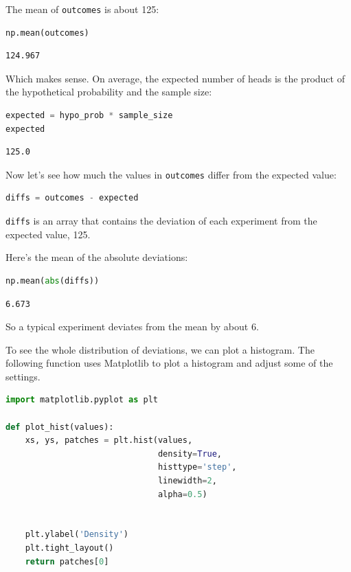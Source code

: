 The mean of \passthrough{\lstinline!outcomes!} is about 125:

\begin{lstlisting}[language=Python,style=source]
np.mean(outcomes)
\end{lstlisting}

\begin{lstlisting}[style=output]
124.967
\end{lstlisting}

Which makes sense. On average, the expected number of heads is the
product of the hypothetical probability and the sample size:

\begin{lstlisting}[language=Python,style=source]
expected = hypo_prob * sample_size
expected
\end{lstlisting}

\begin{lstlisting}[style=output]
125.0
\end{lstlisting}

Now let's see how much the values in \passthrough{\lstinline!outcomes!}
differ from the expected value:

\begin{lstlisting}[language=Python,style=source]
diffs = outcomes - expected
\end{lstlisting}

\passthrough{\lstinline!diffs!} is an array that contains the deviation
of each experiment from the expected value, 125.

Here's the mean of the absolute deviations:

\begin{lstlisting}[language=Python,style=source]
np.mean(abs(diffs))
\end{lstlisting}

\begin{lstlisting}[style=output]
6.673
\end{lstlisting}

So a typical experiment deviates from the mean by about 6.

To see the whole distribution of deviations, we can plot a histogram.
The following function uses Matplotlib to plot a histogram and adjust
some of the settings.

\begin{lstlisting}[language=Python,style=source]
import matplotlib.pyplot as plt

def plot_hist(values):
    xs, ys, patches = plt.hist(values,
                               density=True,
                               histtype='step',
                               linewidth=2,
                               alpha=0.5)
    
    
    plt.ylabel('Density')
    plt.tight_layout()
    return patches[0]
\end{lstlisting}

